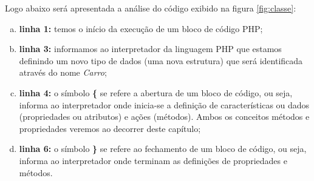 \FloatBarrier 	%

Logo abaixo será apresentada a análise do código exibido na
figura \ref{fig:classe}:

\begin{enumerate}[a)]
    \item \textbf{linha 1:} temos o início da execução de um bloco de código
    PHP;
    \item \textbf{linha 3:} informamos ao interpretador da linguagem PHP que 
    estamos definindo um novo tipo de dados (uma nova estrutura) que será 
    identificada através do nome \textit{Carro};
    \item \textbf{linha 4:} o símbolo \textbf{\{} se refere a abertura de um
    bloco de código, ou seja, informa ao interpretador onde inicia-se a definição de 
    características ou dados (propriedades ou atributos) e ações (métodos). 
    Ambos os conceitos métodos e propriedades veremos ao decorrer deste
    capítulo;
    \item \textbf{linha 6:} o símbolo \textbf{\}} se refere ao fechamento de um
    bloco de código, ou seja, informa ao interpretador onde terminam as
    definições de propriedades e métodos.
\end{enumerate}